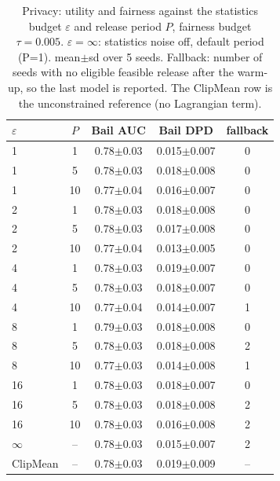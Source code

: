 \begin{table}[tbp]
\centering
\footnotesize
\caption{Privacy: utility and fairness against the statistics budget $\varepsilon$ and release period $P$, fairness budget $\tau=0.005$. $\varepsilon=\infty$: statistics noise off, default period (P=1). mean$\pm$sd over 5 seeds. Fallback: number of seeds with no eligible feasible release after the warm-up, so the last model is reported. The ClipMean row is the unconstrained reference (no Lagrangian term).}
\label{tab:e5b_privacy}
\setlength{\tabcolsep}{3pt}
\begin{tabular}{lcccc}
\toprule
$\varepsilon$ & $P$ & Bail AUC & Bail DPD & fallback \\
\midrule
1 & 1 & 0.78$\pm$0.03 & 0.015$\pm$0.007 & 0 \\
1 & 5 & 0.78$\pm$0.03 & 0.018$\pm$0.008 & 0 \\
1 & 10 & 0.77$\pm$0.04 & 0.016$\pm$0.007 & 0 \\
2 & 1 & 0.78$\pm$0.03 & 0.018$\pm$0.008 & 0 \\
2 & 5 & 0.78$\pm$0.03 & 0.017$\pm$0.008 & 0 \\
2 & 10 & 0.77$\pm$0.04 & 0.013$\pm$0.005 & 0 \\
4 & 1 & 0.78$\pm$0.03 & 0.019$\pm$0.007 & 0 \\
4 & 5 & 0.78$\pm$0.03 & 0.018$\pm$0.007 & 0 \\
4 & 10 & 0.77$\pm$0.04 & 0.014$\pm$0.007 & 1 \\
8 & 1 & 0.79$\pm$0.03 & 0.018$\pm$0.008 & 0 \\
8 & 5 & 0.78$\pm$0.03 & 0.018$\pm$0.008 & 2 \\
8 & 10 & 0.77$\pm$0.03 & 0.014$\pm$0.008 & 1 \\
16 & 1 & 0.78$\pm$0.03 & 0.018$\pm$0.007 & 0 \\
16 & 5 & 0.78$\pm$0.03 & 0.018$\pm$0.008 & 2 \\
16 & 10 & 0.78$\pm$0.03 & 0.016$\pm$0.008 & 2 \\
$\infty$ & -- & 0.78$\pm$0.03 & 0.015$\pm$0.007 & 2 \\
ClipMean & -- & 0.78$\pm$0.03 & 0.019$\pm$0.009 & -- \\
\bottomrule
\end{tabular}
\end{table}
